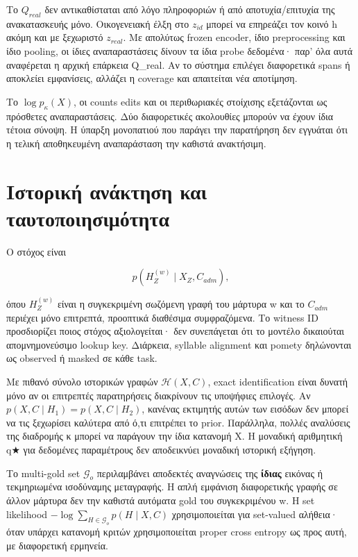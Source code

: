 \documentclass[
  10pt,
  a4paper,
]{report}
\begin{document}
Το \(Q_{real}\) δεν αντικαθίσταται από λόγο πληροφοριών ή από
αποτυχία/επιτυχία της ανακατασκευής μόνο. Οικογενειακή έλξη στο
\(z_{id}\) μπορεί να επηρεάζει τον κοινό h ακόμη και με ξεχωριστό
\(z_{real}\). Με απολύτως frozen encoder, ίδιο preprocessing και ίδιο
pooling, οι ίδιες αναπαραστάσεις δίνουν τα ίδια probe δεδομένα· παρ' όλα
αυτά αναφέρεται η αρχική επάρκεια Q\_real. Αν το σύστημα επιλέγει
διαφορετικά spans ή αποκλείει εμφανίσεις, αλλάζει η coverage και
απαιτείται νέα αποτίμηση.

Το \(\log p_\kappa(X)\), οι counts edits και οι περιθωριακές στοίχισης
εξετάζονται ως πρόσθετες αναπαραστάσεις. Δύο διαφορετικές ακολουθίες
μπορούν να έχουν ίδια τέτοια σύνοψη. Η ύπαρξη μονοπατιού που παράγει την
παρατήρηση δεν εγγυάται ότι η τελική αποθηκευμένη αναπαράσταση την
καθιστά ανακτήσιμη.

\section{Ιστορική ανάκτηση και
ταυτοποιησιμότητα}\label{ux3b9ux3c3ux3c4ux3bfux3c1ux3b9ux3baux3ae-ux3b1ux3bdux3acux3baux3c4ux3b7ux3c3ux3b7-ux3baux3b1ux3b9-ux3c4ux3b1ux3c5ux3c4ux3bfux3c0ux3bfux3b9ux3b7ux3c3ux3b9ux3bcux3ccux3c4ux3b7ux3c4ux3b1}

Ο στόχος είναι

\[p(H_Z^{(w)}\mid X_Z,C_{adm}),\]

όπου \(H_Z^{(w)}\) είναι η συγκεκριμένη σωζόμενη γραφή του μάρτυρα w και
το \(C_{adm}\) περιέχει μόνο επιτρεπτά, προοπτικά διαθέσιμα
συμφραζόμενα. Το witness ID προσδιορίζει ποιος στόχος αξιολογείται· δεν
συνεπάγεται ότι το μοντέλο δικαιούται απομνημονεύσιμο lookup key.
Διάρκεια, syllable alignment και pomety δηλώνονται ως observed ή masked
σε κάθε task.

Με πιθανό σύνολο ιστορικών γραφών \(\mathcal H(X,C)\), exact
identification είναι δυνατή μόνο αν οι επιτρεπτές παρατηρήσεις
διακρίνουν τις υποψήφιες επιλογές. Αν \(p(X,C\mid H_1)=p(X,C\mid H_2)\),
κανένας εκτιμητής αυτών των εισόδων δεν μπορεί να τις ξεχωρίσει καλύτερα
από ό,τι επιτρέπει το prior. Παράλληλα, πολλές αναλύσεις της διαδρομής κ
μπορεί να παράγουν την ίδια κατανομή X. Η μοναδική αριθμητική q★ για
δεδομένες παραμέτρους δεν αποδεικνύει μοναδική ιστορική εξήγηση.

Το multi-gold set \(\mathcal G_o\) περιλαμβάνει αποδεκτές αναγνώσεις της
\textbf{ίδιας} εικόνας ή τεκμηριωμένα ισοδύναμης μεταγραφής. Η απλή
εμφάνιση διαφορετικής γραφής σε άλλον μάρτυρα δεν την καθιστά αυτόματα
gold του συγκεκριμένου w. Η set likelihood
\(-\log\sum_{H\in\mathcal G_o}p(H\mid X,C)\) χρησιμοποιείται για
set-valued αλήθεια· όταν υπάρχει κατανομή κριτών χρησιμοποιείται proper
cross entropy ως προς αυτή, με διαφορετική ερμηνεία.
\end{document}
